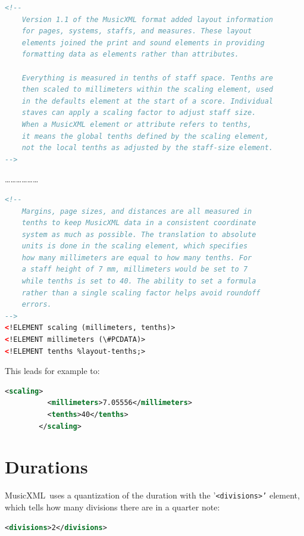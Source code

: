 \documentclass[12pt,a4paper]{article}
\newcommand{\mxml}{MusicXML}
\begin{document}
\begin{lstlisting}[language=XML]
<!--
	Version 1.1 of the MusicXML format added layout information
	for pages, systems, staffs, and measures. These layout
	elements joined the print and sound elements in providing
	formatting data as elements rather than attributes.

	Everything is measured in tenths of staff space. Tenths are
	then scaled to millimeters within the scaling element, used
	in the defaults element at the start of a score. Individual
	staves can apply a scaling factor to adjust staff size.
	When a MusicXML element or attribute refers to tenths,
	it means the global tenths defined by the scaling element,
	not the local tenths as adjusted by the staff-size element.
-->
\end{lstlisting}
\dots \dots \dots \dots \dots \dots
\begin{lstlisting}[language=XML]
<!--
	Margins, page sizes, and distances are all measured in
	tenths to keep MusicXML data in a consistent coordinate
	system as much as possible. The translation to absolute
	units is done in the scaling element, which specifies
	how many millimeters are equal to how many tenths. For
	a staff height of 7 mm, millimeters would be set to 7
	while tenths is set to 40. The ability to set a formula
	rather than a single scaling factor helps avoid roundoff
	errors.
-->
<!ELEMENT scaling (millimeters, tenths)>
<!ELEMENT millimeters (\#PCDATA)>
<!ELEMENT tenths %layout-tenths;>
\end{lstlisting}

This leads for example to:
\begin{lstlisting}[language=XML]
        <scaling>
          <millimeters>7.05556</millimeters>
          <tenths>40</tenths>
        </scaling>
\end{lstlisting}

\section{Durations}

\mxml\ uses a quantization of the duration with the {'\tt <divisions>'} element, which tells how many divisions there are in a quarter note:
\begin{lstlisting}[language=XML]
       <divisions>2</divisions>
\end{lstlisting}
\end{document}
